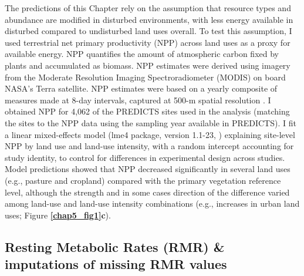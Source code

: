 The predictions of this Chapter rely on the assumption that resource types and abundance are modified in disturbed environments, with less energy available in disturbed compared to undisturbed land uses overall. To test this assumption, I used terrestrial net primary productivity (NPP) across land uses as a proxy for available energy. NPP quantifies the amount of atmospheric carbon fixed by plants and accumulated as biomass. NPP estimates were derived using imagery from the Moderate Resolution Imaging Spectroradiometer (MODIS) on board NASA’s Terra satellite. NPP estimates were based on a yearly composite of measures made at 8-day intervals, captured at 500-m spatial resolution \citep{Running2015}. I obtained NPP for 4,062 of the PREDICTS sites used in the analysis (matching the sites to the NPP data using the sampling year available in PREDICTS). I fit a linear mixed-effects model (lme4 package, version 1.1-23, \citet{Bates2015}) explaining site-level NPP by land use and land-use intensity, with a random intercept accounting for study identity, to control for differences in experimental design across studies. Model predictions showed that NPP decreased significantly in several land uses (e.g., pasture and cropland) compared with the primary vegetation reference level, although the strength and in some cases direction of the difference varied among land-use and land-use intensity combinations (e.g., increases in urban land uses; Figure \textbf{\ref{chap5_fig1}c}).

\subsection{Resting Metabolic Rates (RMR) \& imputations of missing RMR values}


